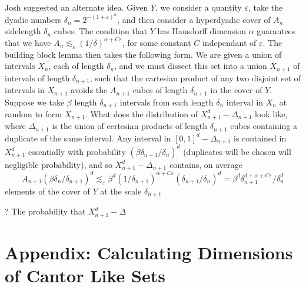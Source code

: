 \documentclass{report}
\theoremstyle{plain}
\theoremstyle{plain}
\begin{document}
Josh suggested an alternate idea. Given $Y$, we consider a quantity $\varepsilon$, take the dyadic numbers $\delta_n = 2^{-(1 + \varepsilon)^n}$, and then consider a hyperdyadic cover of $A_n$ sidelength $\delta_n$ cubes. The condition that $Y$ has Hausdorff dimension $\alpha$ guarantees that we have $A_n \lesssim_\varepsilon (1/\delta)^{\alpha + C\varepsilon}$, for some constant $C$ independant of $\varepsilon$. The building block lemma then takes the following form. We are given a union of intervals $X_n$, each of length $\delta_n$, and we must dissect this set into a union $X_{n+1}$ of intervals of length $\delta_{n+1}$, such that the cartesian product of any two disjoint set of intervals in $X_{n+1}$ avoids the $A_{n+1}$ cubes of length $\delta_{n+1}$ in the cover of $Y$. Suppose we take $\beta$ length $\delta_{n+1}$ intervals from each length $\delta_n$ interval in $X_n$ at random to form $X_{n+1}$. What does the distribution of $X_{n+1}^d - \Delta_{n+1}$ look like, where $\Delta_{n+1}$ is the union of certesian products of length $\delta_{n+1}$ cubes containing a duplicate of the same interval. Any interval in $[0,1]^d - \Delta_{n+1}$ is contained in $X_{n+1}^d$ essentially with probability $(\beta \delta_{n+1}/\delta_n)^d$ (duplicates will be chosen will negligible probability), and so $X_{n+1}^d - \Delta_{n+1}$ contains, on average
%
\[ A_{n+1} (\beta \delta_n/\delta_{n+1})^d \lesssim_\varepsilon \beta^d (1/\delta_{n+1})^{\alpha + C\varepsilon} (\delta_{n+1} / \delta_n)^d = \beta^d \delta_{n+1}^{d + \alpha + C \varepsilon} / \delta_n^d \]
%
elements of the cover of $Y$ at the scale $\delta_{n+1}$

? The probability that $X_{n+1}^d - \Delta$















\chapter{Appendix: Calculating Dimensions of Cantor Like Sets}
\end{document}
